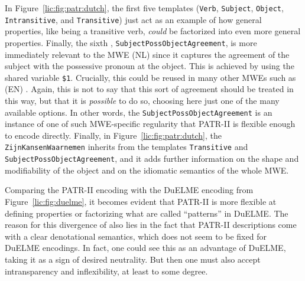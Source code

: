 \documentclass[output=paper
,modfonts
,nonflat
,biblatexbackend=biber
]{langsci/langscibook}
\begin{document}
In Figure~\ref{lic:fig:patr:dutch}, the first five templates (\texttt{Verb}, \texttt{Subject}, \texttt{Object}, \texttt{Intransitive}, and \texttt{Transitive}) just act as an example of how general properties, like being a transitive verb, \textit{could} be factorized into even more general properties. Finally, the sixth , \texttt{SubjectPossObjectAgreement}, is more immediately relevant to the MWE (NL)  since it captures the agreement of the subject with the possessive pronoun at the object. This is achieved by using the shared variable \texttt{\$1}. Crucially, this  could be reused in many other MWEs such as (EN) . Again, this is not to say that this sort of agreement should be treated in this way, but that it is \textit{possible} to do so, choosing here just one of the many available options. In other words, the  \texttt{SubjectPossObjectAgreement} is an instance of one of such MWE-specific regularity that PATR-II is flexible enough to encode directly. Finally, in Figure~\ref{lic:fig:patr:dutch}, the  \texttt{ZijnKansenWaarnemen} inherits from the templates \texttt{Transitive} and \texttt{SubjectPossObjectAgreement}, and it adds further information on the shape and modifiability of the object and on the idiomatic semantics of the whole MWE.

Comparing the PATR-II encoding with the DuELME encoding from Figure~\ref{lic:fig:duelme}, it becomes evident that PATR-II is more flexible at defining properties or factorizing what are called ``patterns'' in DuELME. The reason for this divergence of  also lies in the fact that PATR-II descriptions come with a clear denotational semantics, which does not seem to be fixed for DuELME encodings. In fact, one could see this as an advantage of DuELME, taking it as a sign of desired neutrality. But then one must also accept intransparency and inflexibility, at least to some degree.
\end{document}
